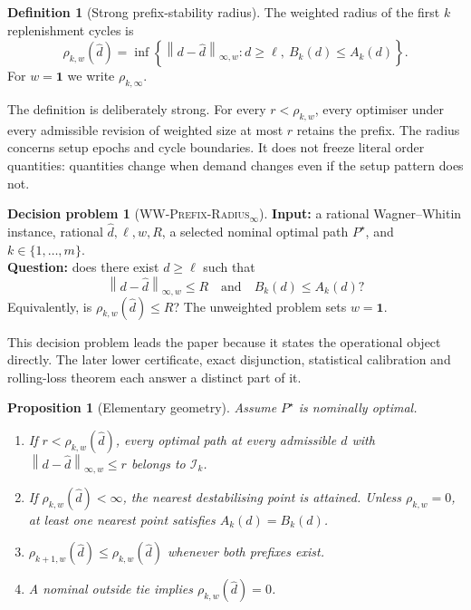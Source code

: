\documentclass[11pt]{article}
\newtheorem{proposition}[theorem]{Proposition}
\theoremstyle{definition}
\newtheorem{definition}[theorem]{Definition}
\newtheorem{problem}[theorem]{Decision problem}
\newcommand{\cI}{\mathcal{I}}
\newcommand{\winf}[1]{\left\lVert #1\right\rVert_{\infty,w}}
\newcommand{\WWR}{\textsc{WW-Prefix-Radius}\ensuremath{_{\infty}}}
\newcommand{\dhat}{\widehat d}
\newcommand{\ellv}{\ell}
\newcommand{\one}{\mathbf{1}}
\begin{document}
\begin{definition}[Strong prefix-stability radius]\label{def:radius}
The weighted radius of the first $k$ replenishment cycles is
\begin{equation}\label{eq:rho}
\rho_{k,w}(\dhat)=
\inf\left\{
\winf{d-\dhat}:d\ge\ellv,\ B_k(d)\le A_k(d)
\right\}.
\end{equation}
For $w=\one$ we write $\rho_{k,\infty}$.
\end{definition}

The definition is deliberately strong. For every $r<\rho_{k,w}$, every optimiser under every admissible revision of weighted size at most $r$ retains the prefix. The radius concerns setup epochs and cycle boundaries. It does not freeze literal order quantities: quantities change when demand changes even if the setup pattern does not.

\begin{problem}[\WWR]\label{prob:decision}
\textbf{Input:} a rational Wagner--Whitin instance, rational $\dhat,\ellv,w,R$, a selected nominal optimal path $P^\star$, and $k\in\{1,\ldots,m\}$.\\
\textbf{Question:} does there exist $d\ge\ellv$ such that
\[
\winf{d-\dhat}\le R
\quad\text{and}\quad
B_k(d)\le A_k(d)?
\]
Equivalently, is $\rho_{k,w}(\dhat)\le R$? The unweighted problem sets $w=\one$.
\end{problem}

This decision problem leads the paper because it states the operational object directly. The later lower certificate, exact disjunction, statistical calibration and rolling-loss theorem each answer a distinct part of it.

\begin{proposition}[Elementary geometry]\label{prop:geometry}
Assume $P^\star$ is nominally optimal.
\begin{enumerate}[label=(\alph*)]
\item If $r<\rho_{k,w}(\dhat)$, every optimal path at every admissible $d$ with $\winf{d-\dhat}\le r$ belongs to $\cI_k$.
\item If $\rho_{k,w}(\dhat)<\infty$, the nearest destabilising point is attained. Unless $\rho_{k,w}=0$, at least one nearest point satisfies $A_k(d)=B_k(d)$.
\item $\rho_{k+1,w}(\dhat)\le\rho_{k,w}(\dhat)$ whenever both prefixes exist.
\item A nominal outside tie implies $\rho_{k,w}(\dhat)=0$.
\end{enumerate}
\end{proposition}
\end{document}
